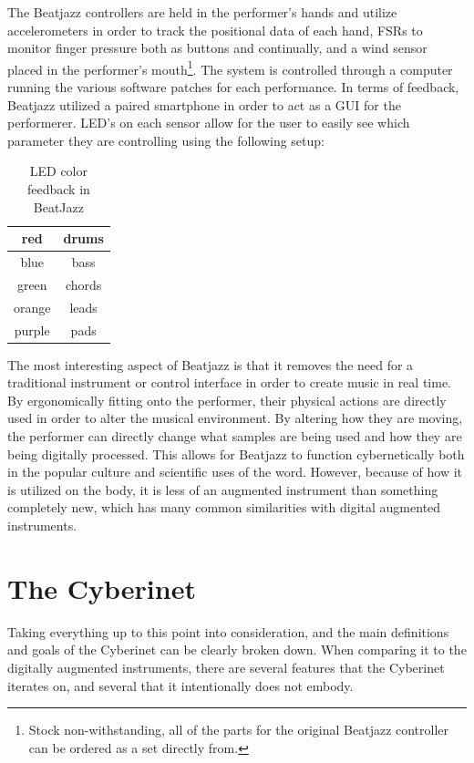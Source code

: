 The Beatjazz controllers are held in the performer's hands and utilize accelerometers in order to track the positional data of each hand, FSRs to monitor finger pressure both as buttons and continually, and a wind sensor placed in the performer's mouth\footnote{Stock non-withstanding, all of the parts for the original Beatjazz controller can be ordered as a set directly from.}. The system is controlled through a computer running the various software patches for each performance. In terms of feedback, Beatjazz utilized a paired smartphone in order to act as a GUI for the performerer. LED's on each sensor allow for the user to easily see which parameter they are controlling using the following setup:

\begin{table}[]
    \centering
    \begin{tabular}{|c||c|}
    \hline
      red   & drums \\
      \hline
      blue   &  bass\\
      \hline
      green & chords \\
      \hline
      orange & leads\\
      \hline
      purple & pads\\
      \hline
    \end{tabular}
    \caption{LED color feedback in BeatJazz}
    \label{tab:bjLEDs}
\end{table}


The most interesting aspect of Beatjazz is that it removes the need for a traditional instrument or control interface in order to create music in real time. By ergonomically fitting onto the performer, their physical actions are directly used in order to alter the musical environment. By altering how they are moving, the performer can directly change what samples are being used and how they are being digitally processed. This allows for Beatjazz to function cybernetically both in the popular culture and scientific uses of the word. However, because of how it is utilized on the body, it is less of an augmented instrument than something completely new, which has many common similarities with digital augmented instruments.

\section{The Cyberinet}
Taking everything up to this point into consideration, and the main definitions and goals of the Cyberinet can be clearly broken down. When comparing it to the digitally augmented instruments, there are several features that the Cyberinet iterates on, and several that it intentionally does not embody.

